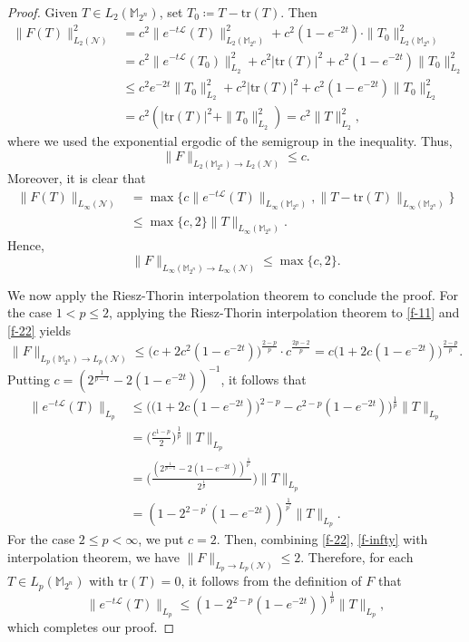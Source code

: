 \documentclass{amsbook}
\theoremstyle{definition}
\theoremstyle{remark}
\numberwithin{section}{chapter}
\numberwithin{equation}{chapter}
\newcommand{\M}{\mathbb{M}}
\newcommand{\1}{\mathbf{1}}
\begin{document}
\begin{proof}
Given $T\in L_2(\M_{2^n})$, set $T_0\coloneqq T-\mathrm{tr}(T)$. Then
\begin{equation*}\label{f-22-1}
\begin{split}
\|F(T)\|_{L_2(\mathcal{N})}^{2}&=c^{2}\|e^{-t\mathcal{L}}(T)\|_{L_2(\mathbb{M}_{2^n})}^2+c^2(1-e^{-2t})\cdot\|T_0\|_{L_2(\mathbb{M}_{2^n})}^{2}\\
&=c^{2}\|e^{-t\mathcal{L}}(T_0)\|^{2}_{L_{2}}+c^{2}|\mathrm{tr}(T)|^{2}+c^{2}(1-e^{-2t})\|T_0\|^{2}_{L_{2}}\\
&\leq c^{2}e^{-2t}\|T_0\|^{2}_{L_{2}}+c^{2}|\mathrm{tr}(T)|^{2}+c^{2}(1-e^{-2t})\|T_0\|^{2}_{L_{2}}\\
&=c^{2}\left(|\mathrm{tr}(T)|^{2}+\|T_0\|^{2}_{L_{2}}\right)=c^{2}\|T\|^{2}_{L_{2}},
\end{split}
\end{equation*}
where we used the exponential ergodic of the semigroup in the inequality. Thus, 
\begin{equation}\label{f-22}
	\|F\|_{L_2(\mathbb{M}_{2^n})\to L_2(\mathcal{N})}\leq c.
\end{equation}
Moreover, it is clear that
\begin{align*}
\|F(T)\|_{L_\infty(\mathcal{N})}&=\max\{c\|e^{-t\mathcal{L}}(T)\|_{L_\infty(\mathbb{M}_{2^n})},\|T-\mathrm{tr}(T)\|_{L_\infty(\mathbb{M}_{2^n})}\}\\
	&\leq \max\{c,2\}\|T\|_{L_\infty(\mathbb{M}_{2^n})}.
\end{align*}
Hence, 
\begin{equation}\label{f-infty}
\|F\|_{L_\infty(\mathbb{M}_{2^n})\to L_\infty(\mathcal{N})}\leq \max\{c,2\}.
\end{equation}

We now apply the Riesz-Thorin interpolation theorem to conclude the proof. For the case $1<p\leq2$, applying the Riesz-Thorin interpolation theorem to \eqref{f-11} and \eqref{f-22} yields
\[
\|F\|_{L_p(\mathbb{M}_{2^n})\to L_p(\mathcal{N})}\leq \big(c+2c^2(1-e^{-2t})\big)^{\frac{2-p}{p}}\cdot c^{\frac{2p-2}{p}}=c\big(1+2c(1-e^{-2t})\big)^{\frac{2-p}{p}}.
\]
Putting $c=\left(2^{\frac{1}{p-1}}-2(1-e^{-2t})\right)^{-1}$, it follows that
\begin{equation*}\label{f-p12}
\begin{aligned}
\|e^{-t\mathcal{L}}(T)\|_{L_{p}}&\leq \Big(\big(1+2c(1-e^{-2t})\big)^{2-p}-c^{2-p}(1-e^{-2t})\Big)^{\frac{1}{p}}\|T\|_{L_{p}}\\
&=\Big(\frac{c^{1-p}}{2}\Big)^{\frac{1}{p}}\|T\|_{L_{p}}\\
&=\Big(\frac{(2^{\frac{1}{p-1}}-2(1-e^{-2t}))^{\frac{1}{p^{\prime}}}}{2^{\frac{1}{p}}}\Big)\|T\|_{L_{p}}\\
&=(1-2^{2-p^{\prime}}(1-e^{-2t}))^{\frac{1}{p^{\prime}}}\|T\|_{L_{p}}.
\end{aligned}
\end{equation*}
For the case $2\leq p<\infty$, we put $c=2$. Then, combining  \eqref{f-22}, \eqref{f-infty} with interpolation theorem, we have $\|F\|_{L_{p}\to L_p(\mathcal{N})}\leq 2$. Therefore, for each $T\in L_{p}(\mathbb{M}_{2^{n}})$ with $\mathrm{tr}(T)=0$, it follows from the definition of $F$ that
\[
\|e^{-t\mathcal{L}}(T)\|_{L_{p}}\leq (1-2^{2-p}(1-e^{-2t}))^{\frac{1}{p}}\|T\|_{L_{p}},
\]
which completes our proof.
\end{proof}
\end{document}
